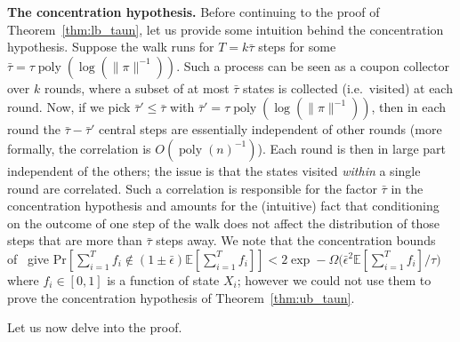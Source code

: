 \documentclass[a4paper,11pt]{article}
\newcommand{\E}{\mathbb{E}}
\newcommand{\prob}{\text{Pr}}
\newcommand{\poly}{\operatorname{poly}}
\begin{document}
\textbf{The concentration hypothesis.}
Before continuing to the proof of Theorem~\ref{thm:lb_taun}, let us provide some intuition behind the concentration hypothesis.
Suppose the walk runs for $T = k \bar{\tau}$ steps for some $\bar{\tau} = \tau \poly(\log(\|\pi\|^{-1}))$.
Such a process can be seen as a coupon collector over $k$ rounds, where a subset of at most $\bar{\tau}$ states is collected (i.e.\ visited) at each round.
Now, if we pick $\bar{\tau}' \le \bar{\tau}$ with $\bar{\tau}' = \tau \poly(\log(\|\pi\|^{-1}))$, then in each round the $\bar{\tau} - \bar{\tau}'$ central steps are essentially independent of other rounds (more formally, the correlation is $O(\poly(n)^{-1})$).
Each round is then in large part independent of the others; the issue is that the states visited \textit{within} a single round are correlated.
Such a correlation is responsible for the factor $\bar{\tau}$ in the concentration hypothesis and amounts for the (intuitive) fact that conditioning on the outcome of one step of the walk does not affect the distribution of those steps that are more than $\bar{\tau}$ steps away.
We note that the concentration bounds of~\cite{Chung&2012} give $\prob[\sum_{i=1}^T f_i \notin (1 \pm \bar{\epsilon})\E[\sum_{i=1}^T f_i]] < 2\exp{\!-\Omega\big(\bar{\epsilon}^2 \E[\sum_{i=1}^T f_i] / \tau\big)}$ where $f_i \in [0,1]$ is a function of state $X_i$; however we could not use them to prove the concentration hypothesis of Theorem~\ref{thm:ub_taun}.

Let us now delve into the proof.
\end{document}
